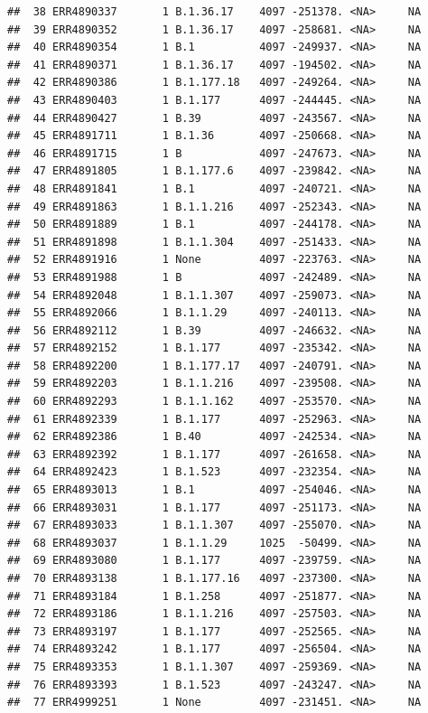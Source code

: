 \documentclass[
]{article}
\begin{document}
\begin{verbatim}
##  38 ERR4890337       1 B.1.36.17    4097 -251378. <NA>     NA
##  39 ERR4890352       1 B.1.36.17    4097 -258681. <NA>     NA
##  40 ERR4890354       1 B.1          4097 -249937. <NA>     NA
##  41 ERR4890371       1 B.1.36.17    4097 -194502. <NA>     NA
##  42 ERR4890386       1 B.1.177.18   4097 -249264. <NA>     NA
##  43 ERR4890403       1 B.1.177      4097 -244445. <NA>     NA
##  44 ERR4890427       1 B.39         4097 -243567. <NA>     NA
##  45 ERR4891711       1 B.1.36       4097 -250668. <NA>     NA
##  46 ERR4891715       1 B            4097 -247673. <NA>     NA
##  47 ERR4891805       1 B.1.177.6    4097 -239842. <NA>     NA
##  48 ERR4891841       1 B.1          4097 -240721. <NA>     NA
##  49 ERR4891863       1 B.1.1.216    4097 -252343. <NA>     NA
##  50 ERR4891889       1 B.1          4097 -244178. <NA>     NA
##  51 ERR4891898       1 B.1.1.304    4097 -251433. <NA>     NA
##  52 ERR4891916       1 None         4097 -223763. <NA>     NA
##  53 ERR4891988       1 B            4097 -242489. <NA>     NA
##  54 ERR4892048       1 B.1.1.307    4097 -259073. <NA>     NA
##  55 ERR4892066       1 B.1.1.29     4097 -240113. <NA>     NA
##  56 ERR4892112       1 B.39         4097 -246632. <NA>     NA
##  57 ERR4892152       1 B.1.177      4097 -235342. <NA>     NA
##  58 ERR4892200       1 B.1.177.17   4097 -240791. <NA>     NA
##  59 ERR4892203       1 B.1.1.216    4097 -239508. <NA>     NA
##  60 ERR4892293       1 B.1.1.162    4097 -253570. <NA>     NA
##  61 ERR4892339       1 B.1.177      4097 -252963. <NA>     NA
##  62 ERR4892386       1 B.40         4097 -242534. <NA>     NA
##  63 ERR4892392       1 B.1.177      4097 -261658. <NA>     NA
##  64 ERR4892423       1 B.1.523      4097 -232354. <NA>     NA
##  65 ERR4893013       1 B.1          4097 -254046. <NA>     NA
##  66 ERR4893031       1 B.1.177      4097 -251173. <NA>     NA
##  67 ERR4893033       1 B.1.1.307    4097 -255070. <NA>     NA
##  68 ERR4893037       1 B.1.1.29     1025  -50499. <NA>     NA
##  69 ERR4893080       1 B.1.177      4097 -239759. <NA>     NA
##  70 ERR4893138       1 B.1.177.16   4097 -237300. <NA>     NA
##  71 ERR4893184       1 B.1.258      4097 -251877. <NA>     NA
##  72 ERR4893186       1 B.1.1.216    4097 -257503. <NA>     NA
##  73 ERR4893197       1 B.1.177      4097 -252565. <NA>     NA
##  74 ERR4893242       1 B.1.177      4097 -256504. <NA>     NA
##  75 ERR4893353       1 B.1.1.307    4097 -259369. <NA>     NA
##  76 ERR4893393       1 B.1.523      4097 -243247. <NA>     NA
##  77 ERR4999251       1 None         4097 -231451. <NA>     NA

\end{verbatim}
\end{document}
